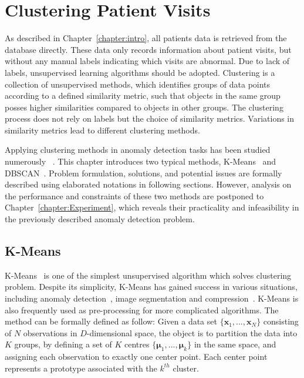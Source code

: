 \chapter{Clustering Patient Visits}
\label{chapter:clustering}

As described in Chapter~\ref{chapter:intro}, all patients data is retrieved from the database directly. These data only records information about patient visits, but without any manual labels indicating which visits are abnormal. Due to lack of labels, unsupervised learning algorithms should be adopted. Clustering is a collection of unsupervised methods, which identifies groups of data points according to a defined similarity metric, such that objects in the same group posses higher similarities compared to objects in other groups. The clustering process does not rely on labels but the choice of similarity metrics. Variations in similarity metrics lead to different clustering methods.

Applying clustering methods in anomaly detection tasks has been studied numerously~\cite{he2003discovering}
. This chapter introduces two typical methods, K-Means~\cite{lloyd1982least} and DBSCAN~\cite{ester1996density}. Problem formulation, solutions, and potential issues are formally described using elaborated notations in following sections. However, analysis on the performance and constraints of these two methods are postponed to Chapter~\ref{chapter:Experiment}, which reveals their practicality and infeasibility in the previously described anomaly detection problem.

\section{K-Means}
\label{sec:k-means}

K-Means~\cite{lloyd1982least} is one of the simplest unsupervised algorithm which solves clustering problem. Despite its simplicity, K-Means has gained success in various situations, including anomaly detection~\cite{campello2015hierarchical}\cite{he2003discovering}, image segmentation and compression~\cite{forsyth2002computer}. K-Means is also frequently used as pre-processing for more complicated algorithms. The method can be formally defined as follow: Given a data set $\{\mathbf{x}_1, ... , \mathbf{x}_N\}$ consisting of $N$ observations in $D$-dimensional space, the object is to partition the data into $K$ groups, by defining a set of $K$ centres $\{\boldsymbol{\mu}_1, ... , \boldsymbol{\mu}_k\}$ in the same space, and assigning each observation to exactly one center point. Each center point represents a prototype associated with the $k^{th}$ cluster.

